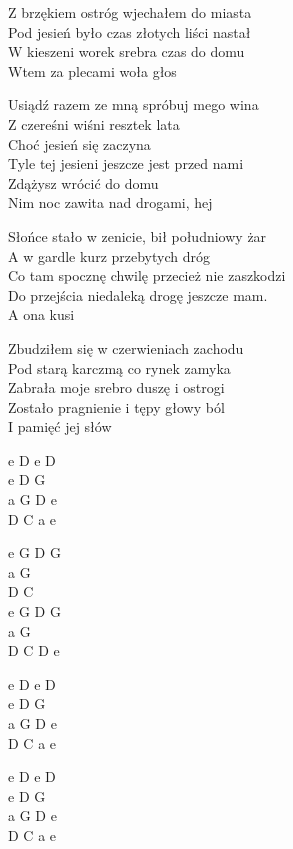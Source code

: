 \begin{text}
    Z brzękiem ostróg wjechałem do miasta\\
    Pod jesień było czas złotych liści nastał\\
    W kieszeni worek srebra czas do domu\\
    Wtem za plecami woła głos

    \vin Usiądź razem ze mną spróbuj mego wina\\
    \vin Z czereśni wiśni resztek lata\\
    \vin Choć jesień się zaczyna\\
    \vin Tyle tej jesieni jeszcze jest przed nami\\
    \vin Zdążysz wrócić do domu\\
    \vin Nim noc zawita nad drogami, hej

    Słońce stało w zenicie, bił południowy żar\\
    A w gardle kurz przebytych dróg\\
    Co tam spocznę chwilę przecież nie zaszkodzi\\
    Do przejścia niedaleką drogę jeszcze mam.\\
    A ona kusi

    Zbudziłem się w czerwieniach zachodu\\
    Pod starą karczmą co rynek zamyka\\
    Zabrała moje srebro duszę i ostrogi\\
    Zostało pragnienie i tępy głowy ból\\
    I pamięć jej słów
\end{text}
\begin{chord}
    e D e D\\
    e D G\\
    a G D e\\
    D C a e

    e G D G\\
    a G\\
    D C\\
    e G D G\\
    a G\\
    D C D e

    e D e D\\
    e D G\\
    a G D e\\
    D C a e

    \hfill\break
    e D e D\\
    e D G\\
    a G D e\\
    D C a e
\end{chord}